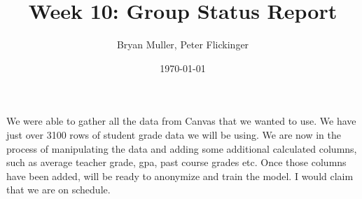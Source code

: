 \documentclass[11pt]{article}
\author{Bryan Muller, Peter Flickinger}
\date{\today}
\title{Week 10: Group Status Report}
\begin{document}
\maketitle
We were able to gather all the data from Canvas that we wanted to use. We have
just over 3100 rows of student grade data we will be using. We are now in the
process of manipulating the data and adding some additional calculated columns,
such as average teacher grade, gpa, past course grades etc. Once those columns
have been added, will be ready to anonymize and train the model. I would claim
that we are on schedule.
\end{document}
